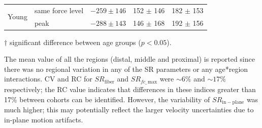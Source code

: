 \begin{table}[!htb]
\begin{center}
\begin{threeparttable}
\begin{tabular}{@{}llrrr@{}}
\multicolumn{1}{l}{\multirow{2}{*}{Young}}                      & same force level & $-259 \pm 146$  & 152 $\pm$ 146    & 182 $\pm$ 153  	\\
      	                                    & peak             & $-288 \pm 143$\tnote{$\dagger$} & 146 $\pm$ 168    & 192 $\pm$ 156  	\\ \midrule[0.3pt]\bottomrule[1pt]
\end{tabular}
\begin{tablenotes}[flushleft]\footnotesize
\item[$\dagger$] significant difference between age groups ($p<0.05$).
\end{tablenotes}
\end{threeparttable}
\end{center}
\vspace{-0.2cm}
\end{table}
The mean value of all the regions (distal, middle and proximal) is reported since there was no regional variation in any of the SR parameters or any age*region interactions. 
CV and RC for $SR_{\mathrm{fiber}}$ and $SR_{fc\_\,\mathrm{max}}$ were $\sim 6\%$ and $\sim 17\%$ respectively; the RC value indicates that differences in these indices greater than 17\% between cohorts can be identified. 
However, the variability of $SR_{\mathrm{in-plane}}$ was much higher; this may potentially reflect the larger velocity uncertainties due to in-plane motion artifacts. 

